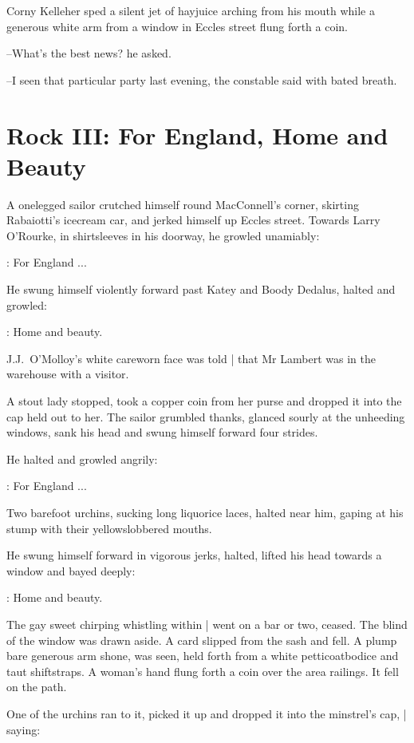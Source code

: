 Corny Kelleher sped a silent jet of hayjuice arching from his mouth
while a generous white arm from a window in Eccles street
flung forth a coin.

--What's the best news? he asked.

--I seen that particular party last evening,
the constable said with bated breath.


\section*{Rock III: For England, Home and Beauty}


A onelegged sailor crutched himself round MacConnell's corner,
skirting Rabaiotti's icecream car,
and jerked himself up Eccles street.
Towards Larry O'Rourke,
in shirtsleeves in his doorway,
he growled unamiably:

\sailor:
For England ...

He swung himself violently forward past Katey and Boody Dedalus,
halted and growled:

\sailor:
Home and beauty.

J.J.~O'Molloy's white careworn face was told |
that Mr Lambert was in the warehouse with a visitor.

A stout lady stopped,
took a copper coin from her purse
and dropped it into the cap held out to her.
The sailor grumbled thanks,
glanced sourly at the unheeding windows,
sank his head
and swung himself forward four strides.

He halted and growled angrily:

\sailor:
For England ...

Two barefoot urchins,
sucking long liquorice laces,
halted near him,
gaping at his stump with their yellowslobbered mouths.

He swung himself forward in vigorous jerks,
halted,
lifted his head towards a window
and bayed deeply:

\sailor:
Home and beauty.

The gay sweet chirping whistling within |
went on a bar or two, ceased.
The blind of the window was drawn aside.
A card 
slipped from the sash and fell.
A plump bare generous arm shone,
was seen,
held forth from a white petticoatbodice and taut shiftstraps.
A woman's hand flung forth a coin
over the area railings.
It fell on the path.

One of the urchins ran to it,
picked it up and dropped it into the minstrel's cap, |
saying:


